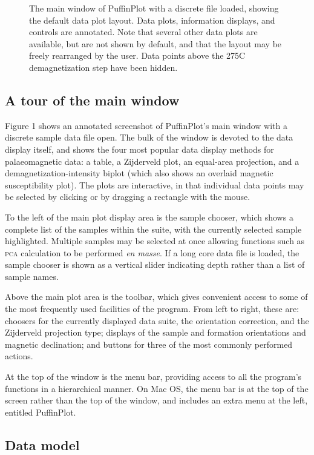 \documentclass[a4paper]{article}
\newcommand{\caps}[1]{\textsc{#1}} %
\begin{document}
\begin{figure}[htbp]
\fi
\caption{The main window of PuffinPlot with a discrete file loaded,
showing the default data plot layout. Data plots, information displays,
and controls are annotated. Note that several other data plots are
available, but are not shown by default, and that the layout may be
freely rearranged by the user. Data points above the 275\textdegree C
demagnetization step have been hidden.}
\end{figure}

\subsection{A tour of the main window}

Figure 1 shows an annotated screenshot of PuffinPlot's main window with
a discrete sample data file open. The bulk of the window is devoted to
the data display itself, and shows the four most popular data display
methods for palaeomagnetic data: a table, a Zijderveld plot, an
equal-area projection, and a demagnetization-intensity biplot (which
also shows an overlaid magnetic susceptibility plot). The plots are
interactive, in that individual data points may be selected by clicking
or by dragging a rectangle with the mouse.

To the left of the main plot display area is the sample chooser, which shows
a complete list of the samples within the suite, with the currently selected
sample highlighted. Multiple samples may be selected at once allowing
functions such as \caps{pca} calculation to be performed \emph{en masse}. If
a long core data file is loaded, the sample chooser is shown as a vertical
slider indicating depth rather than a list of sample names.

Above the main plot area is the toolbar, which gives convenient access
to some of the most frequently used facilities of the program. From left
to right, these are: choosers for the currently displayed data suite,
the orientation correction, and the Zijderveld projection type; displays
of the sample and formation orientations and magnetic declination; and
buttons for three of the most commonly performed actions.

At the top of the window is the menu bar, providing access to all the
program's functions in a hierarchical manner. On Mac OS, the menu bar is
at the top of the screen rather than the top of the window, and includes
an extra menu at the left, entitled \textsf{PuffinPlot}.

\subsection{Data model}
\end{document}
